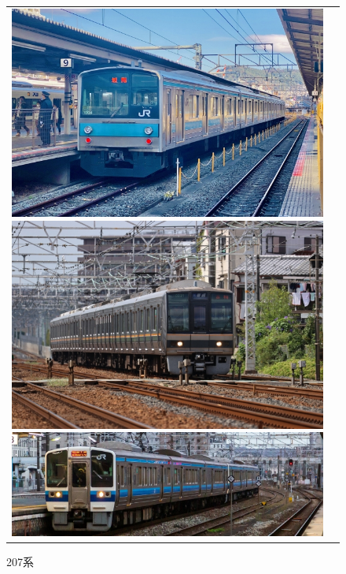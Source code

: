\begin{figure}[htbp]
	\begin{tabular}{cc}
	\begin{minipage}[b]{0.15\linewidth}
			\centering
			\includegraphics[width=\linewidth]{densya/205.jpg}
			\caption{205系}
			\label{fig:205}
	\end{minipage}
	\begin{minipage}[b]{0.15\textwidth}
		\includegraphics[width=\linewidth]{densya/207.jpg}
		\caption{207系}
		\label{fig:207}
	\end{minipage}
	\begin{minipage}[b]{0.15\textwidth}
		\includegraphics[width=\linewidth]{densya/213.jpg}

\end{minipage}
\end{tabular}
\end{figure}
